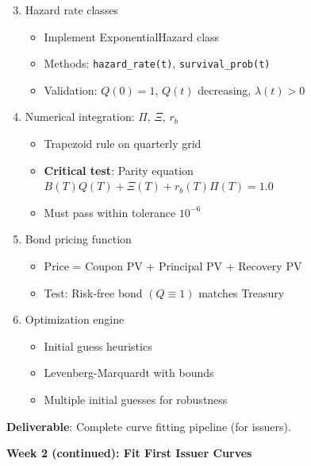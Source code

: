 \documentclass[11pt,a4paper]{article}
\begin{document}
\begin{enumerate}
    \setcounter{enumi}{2}
    \item Hazard rate classes
    \begin{itemize}
        \item Implement ExponentialHazard class
        \item Methods: \texttt{hazard\_rate(t)}, \texttt{survival\_prob(t)}
        \item Validation: $Q(0) = 1$, $Q(t)$ decreasing, $\lambda(t) > 0$
    \end{itemize}
    
    \item Numerical integration: $\Pi$, $\Xi$, $r_b$
    \begin{itemize}
        \item Trapezoid rule on quarterly grid
        \item \textbf{Critical test}: Parity equation $B(T)Q(T) + \Xi(T) + r_b(T)\Pi(T) = 1.0$
        \item Must pass within tolerance $10^{-6}$
    \end{itemize}
    
    \item Bond pricing function
    \begin{itemize}
        \item Price = Coupon PV + Principal PV + Recovery PV
        \item Test: Risk-free bond $(Q \equiv 1)$ matches Treasury
    \end{itemize}
    
    \item Optimization engine
    \begin{itemize}
        \item Initial guess heuristics
        \item Levenberg-Marquardt with bounds
        \item Multiple initial guesses for robustness
    \end{itemize}
\end{enumerate}

\textbf{Deliverable}: Complete curve fitting pipeline (for issuers).

\vspace{0.5cm}

\textbf{Week 2 (continued): Fit First Issuer Curves}
\end{document}
